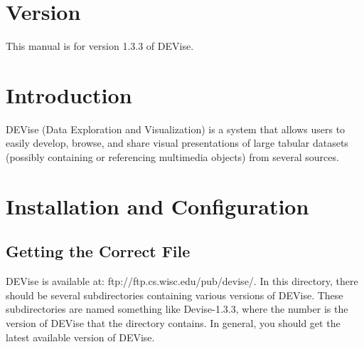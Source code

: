\maketitle


\section{Version}

This manual is for version 1.3.3 of DEVise.


\section{Introduction}

DEVise (Data Exploration and Visualization) is a system that allows users to easily develop,
browse, and share visual presentations of large tabular datasets (possibly containing or
referencing multimedia objects) from several sources. 



\section{Installation and Configuration}

\subsection{Getting the Correct  File}

DEVise is available at: ftp://ftp.cs.wisc.edu/pub/devise/.
In this directory, there should be several subdirectories containing various versions
of DEVise.  These subdirectories are named something like Devise-1.3.3, where the
number is the version of DEVise that the directory contains.  In general,
you should get the latest available version of DEVise.

